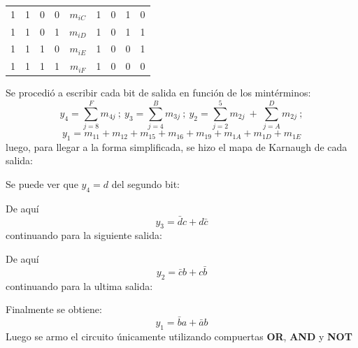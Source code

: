 \documentclass[a4paper]{article}
\begin{document}
\begin{table}[H]
\begin{tabular}{|c|c|c|c|c|c|c|c|c|}
1                                  & 1                                 & 0                                 & 0            & \textbf{$m_{iC}$} & 1                                   & 0                                   & 1                                   & 0                                   \\ \cline{5-5}
1                                  & 1                                 & 0                                 & 1            & \textbf{$m_{iD}$} & 1                                   & 0                                   & 1                                   & 1                                   \\ \cline{5-5}
1                                  & 1                                 & 1                                 & 0            & \textbf{$m_{iE}$} & 1                                   & 0                                   & 0                                   & 1                                   \\ \cline{5-5}
1                                  & 1                                 & 1                                 & 1            & \textbf{$m_{iF}$} & 1                                   & 0                                   & 0                                   & 0                                   \\ \cline{5-5}
\hline
\end{tabular}
\end{table}

Se procedió a escribir cada bit de salida en función de los mintérminos:
\[
	y_4 = \sum_{j=8}^{F} m_{4j}  \  ; \ y_3 = \sum_{j=4}^{B} m_{3j}\  ; \ y_2 = \sum_{j=2}^{5} m_{2j} \ + \  \sum_{j=A}^{D} m_{2j}  \  ;\]
\[
	y_1=m_{11}+m_{12}+m_{15}+m_{16}+m_{19}+m_{1A}+m_{1D}+m_{1E} 
\]
luego, para llegar a la forma simplificada, se hizo el mapa de Karnaugh de cada salida:



Se puede ver que $y_4 = d$ del segundo bit:



De aquí $$y_3 = \bar{d}c+d\bar{c}$$
continuando para la siguiente salida:



De aquí $$y_2 = \bar{c}b+c\bar{b}$$
continuando para la ultima salida:



Finalmente se obtiene: $$y_1 = \bar{b}a+\bar{a}b$$
Luego se armo el circuito únicamente utilizando compuertas \textbf{OR}, \textbf{AND} y \textbf{NOT}
\end{document}
